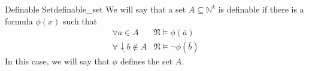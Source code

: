 \begin{definition}{Definable Set}{definable_set}
We will say that a set $A \subseteq \mathbb{N}^{k}$ is definable if there is a formula $\phi(x)$ such that
$$
\begin{array}{ll}
\forall a \in A & \mathfrak{N} \models \phi(\bar{a}) \\
\forall \underline{\downarrow b} \notin A & \mathfrak{N} \models \neg \phi(\bar{b})
\end{array}
$$
In this case, we will say that $\phi$ defines the set $A$.
\end{definition}
